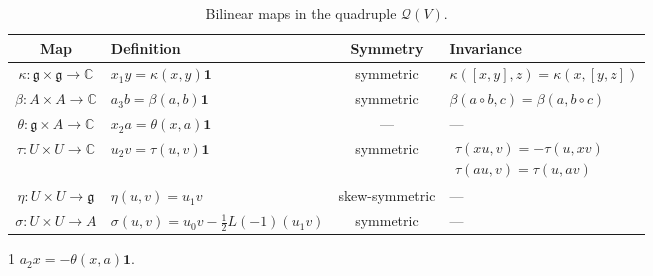 \documentclass[12pt]{article}
\numberwithin{equation}{section}
\theoremstyle{definition}
\theoremstyle{plain}
\newcommand{\bC}{\ensuremath{\mathbb{C}}}
\newcommand{\fg}{\mathfrak{g}}
\newcommand{\cQ}{\ensuremath{\mathcal{Q}}}
\newcommand{\bone}{\mathbf{1 }}
\begin{document}
\begin{table}[H]
\centering
\small
\linespread{1}\selectfont

\begin{threeparttable}
\caption{Bilinear maps in the quadruple $\cQ(V)$.}
\label{tab:bilinear.maps}

\begin{tabularx}{\textwidth}{
    @{}c
    >{\centering\arraybackslash}X
    c
    >{\centering\arraybackslash}X@{}
}
\toprule
Map & Definition & Symmetry & Invariance \\
\midrule

$\kappa:\fg\times\fg\to\bC$
& $x_1y=\kappa(x,y)\bone$
& symmetric
& $\kappa([x,y],z)=\kappa(x,[y,z])$ \\

$\beta:A\times A\to\bC$
& $a_3b=\beta(a,b)\bone$
& symmetric
& $\beta(a\circ b,c)=\beta(a,b\circ c)$ \\

$\theta:\fg\times A\to\bC$
& $x_2a=\theta(x,a)\bone$\tnote{1}
& ---
& --- \\

$\tau:U\times U\to\bC$
& $u_2v=\tau(u,v)\bone$
& symmetric
& $\begin{gathered}
    \tau(xu,v)=-\tau(u,xv)\\
    \tau(au,v)=\tau(u,av)
  \end{gathered}$ \\

$\eta:U\times U\to\fg$
& $\eta(u,v)=u_1v$
& skew-symmetric
& --- \\

$\sigma:U\times U\to A$
& $\sigma(u,v)=u_0v-\frac12L(-1)(u_1v)$
& symmetric
& --- \\

\bottomrule
\end{tabularx}

\begin{tablenotes}[flushleft]
\footnotesize
\item[1] $a_2x=-\theta(x,a)\bone$.
\end{tablenotes}
\end{threeparttable}
\end{table}
\end{document}
